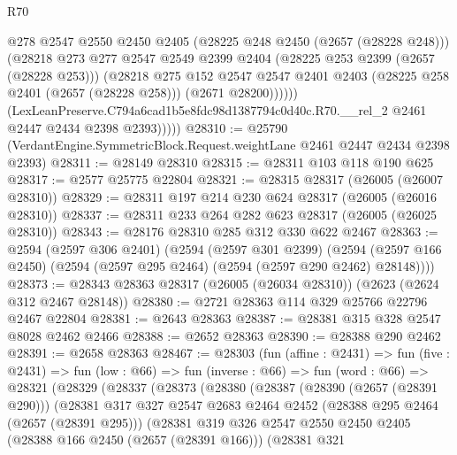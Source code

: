 \begin{lexlean}{R70}
\begin{coremodule}
                  @278
                  @2547
                  @2550
                  @2450
                  @2405
                  (@28225 @248 @2450 (@2657 (@28228 @248)))
                  (@28218
                    @273
                    @277
                    @2547
                    @2549
                    @2399
                    @2404
                    (@28225 @253 @2399 (@2657 (@28228 @253)))
                    (@28218
                      @275
                      @152
                      @2547
                      @2547
                      @2401
                      @2403
                      (@28225 @258 @2401 (@2657 (@28228 @258)))
                      (@2671 @28200))))))
            (LexLeanPreserve.C794a6cad1b5e8fdc98d1387794c0d40c.R70.__rel_2
              @2461
              @2447
              @2434
              @2398
              @2393)))))
@28310 := @25790 (VerdantEngine.SymmetricBlock.Request.weightLane @2461 @2447 @2434 @2398 @2393)
@28311 := @28149 @28310
@28315 := @28311 @103 @118 @190 @625
@28317 := @2577 @25775 @22804
@28321 := @28315 @28317 (@26005 (@26007 @28310))
@28329 := @28311 @197 @214 @230 @624 @28317 (@26005 (@26016 @28310))
@28337 := @28311 @233 @264 @282 @623 @28317 (@26005 (@26025 @28310))
@28343 := @28176 @28310 @285 @312 @330 @622 @2467
@28363 := @2594
    (@2597 @306 @2401)
    (@2594
      (@2597 @301 @2399)
      (@2594 (@2597 @166 @2450) (@2594 (@2597 @295 @2464) (@2594 (@2597 @290 @2462) @28148))))
@28373 := @28343 @28363 @28317 (@26005 (@26034 @28310)) (@2623 (@2624 @312 @2467 @28148))
@28380 := @2721 @28363 @114 @329 @25766 @22796 @2467 @22804
@28381 := @2643 @28363
@28387 := @28381 @315 @328 @2547 @8028 @2462 @2466
@28388 := @2652 @28363
@28390 := @28388 @290 @2462
@28391 := @2658 @28363
@28467 := @28303
    (fun (affine : @2431) =>
    fun (five : @2431) =>
    fun (low : @66) =>
    fun (inverse : @66) =>
    fun (word : @66) =>
    @28321
      (@28329
        (@28337
          (@28373
            (@28380
              (@28387
                (@28390 (@2657 (@28391 @290)))
                (@28381
                  @317
                  @327
                  @2547
                  @2683
                  @2464
                  @2452
                  (@28388 @295 @2464 (@2657 (@28391 @295)))
                  (@28381
                    @319
                    @326
                    @2547
                    @2550
                    @2450
                    @2405
                    (@28388 @166 @2450 (@2657 (@28391 @166)))
                    (@28381
                      @321

\end{coremodule}
\end{lexlean}
